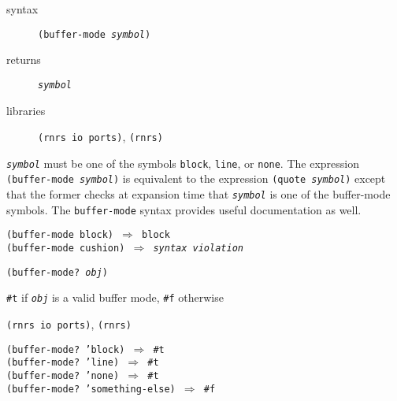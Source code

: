 \begin{description}

\label{io_s27}\item[syntax] \texttt{(buffer-mode \textit{symbol})}



\item[returns] \texttt{\textit{symbol}}


\item[libraries] \texttt{(rnrs io ports)}, \texttt{(rnrs)}
\end{description}

\texttt{\textit{symbol}} must be one of the symbols \texttt{block}, \texttt{line}, or
\texttt{none}.
The expression \texttt{(buffer-mode \textit{symbol})} is equivalent to the
expression \texttt{(quote \textit{symbol})} except that the former checks at
expansion time that \texttt{\textit{symbol}} is one of the buffer-mode symbols.
The \texttt{buffer-mode} syntax provides useful documentation as well.

\begin{alltt}
(buffer-mode block) \(\Rightarrow\) block
(buffer-mode cushion) \(\Rightarrow\) \textit{syntax violation}
\end{alltt}

\begin{description}

\label{io_s28}\item[syntax] \texttt{(buffer-mode? \textit{obj})}



\item[returns] \texttt{\#{}t} if \texttt{\textit{obj}} is a valid buffer mode, \texttt{\#{}f} otherwise


\item[libraries] \texttt{(rnrs io ports)}, \texttt{(rnrs)}
\end{description}


\begin{alltt}
(buffer-mode? 'block) \(\Rightarrow\) \#{}t
(buffer-mode? 'line) \(\Rightarrow\) \#{}t
(buffer-mode? 'none) \(\Rightarrow\) \#{}t
(buffer-mode? 'something-else) \(\Rightarrow\) \#{}f
\end{alltt}

